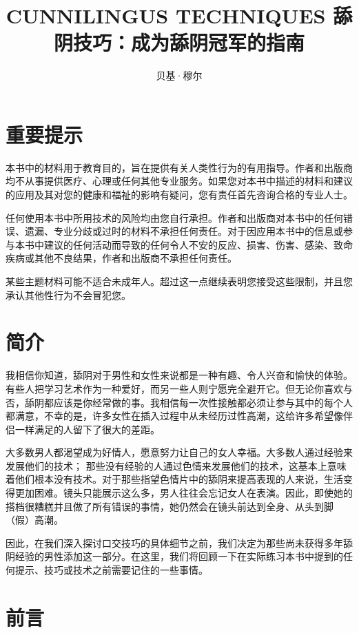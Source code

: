 \documentclass[12pt,UTF8]{ctexbook}
\title{\heiti\zihao{0} CUNNILINGUS TECHNIQUES 舔阴技巧：成为舔阴冠军的指南}
\author{贝基·穆尔}
\date{}
\begin{document}
\maketitle
\tableofcontents

\frontmatter

\chapter{重要提示}

本书中的材料用于教育目的，旨在提供有关人类性行为的有用指导。作者和出版商均不从事提供医疗、心理或任何其他专业服务。如果您对本书中描述的材料和建议的应用及其对您的健康和福祉的影响有疑问，您有责任首先咨询合格的专业人士。

任何使用本书中所用技术的风险均由您自行承担。作者和出版商对本书中的任何错误、遗漏、专业分歧或过时的材料不承担任何责任。对于因应用本书中的信息或参与本书中建议的任何活动而导致的任何令人不安的反应、损害、伤害、感染、致命疾病或其他不良结果，作者和出版商不承担任何责任。

某些主题材料可能不适合未成年人。超过这一点继续表明您接受这些限制，并且您承认其他性行为不会冒犯您。

\chapter{简介}

我相信你知道，舔阴对于男性和女性来说都是一种有趣、令人兴奋和愉快的体验。有些人把学习艺术作为一种爱好，而另一些人则宁愿完全避开它。但无论你喜欢与否，舔阴都应该是你经常做的事。我相信每一次性接触都必须让参与其中的每个人都满意，不幸的是，许多女性在插入过程中从未经历过性高潮，这给许多希望像伴侣一样满足的人留下了很大的差距。

大多数男人都渴望成为好情人，愿意努力让自己的女人幸福。大多数人通过经验来发展他们的技术； 那些没有经验的人通过色情来发展他们的技术，这基本上意味着他们根本没有技术。对于那些指望色情片中的舔阴来提高表现的人来说，生活变得更加困难。镜头只能展示这么多，男人往往会忘记女人在表演。因此，即使她的搭档很糟糕并且做了所有错误的事情，她仍然会在镜头前达到全身、从头到脚（假）高潮。

因此，在我们深入探讨口交技巧的具体细节之前，我们决定为那些尚未获得多年舔阴经验的男性添加这一部分。在这里，我们将回顾一下在实际练习本书中提到的任何提示、技巧或技术之前需要记住的一些事情。

\chapter{前言}
\end{document}
